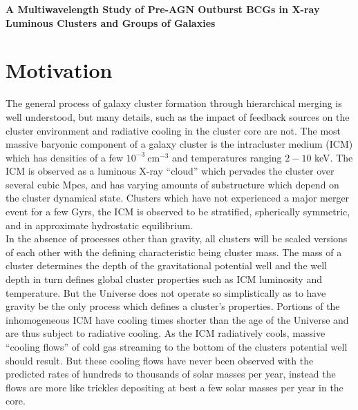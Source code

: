 \documentclass[11pt]{article}
\begin{document}
\begin{center}
\LARGE
\textbf{A Multiwavelength Study of Pre-AGN Outburst BCGs in X-ray
Luminous Clusters and Groups of Galaxies}
\end{center}
\normalsize

\section{Motivation}

The general process of galaxy cluster formation through hierarchical
merging is well understood, but many details, such as the impact of
feedback sources on the cluster environment and radiative cooling in
the cluster core are not. The most massive baryonic component of a
galaxy cluster is the intracluster medium (ICM) which has densities of
a few $10^{-3} \mathrm{~cm}^{-3}$ and temperatures ranging
$2-10$ keV. The ICM is observed as a luminous X-ray ``cloud'' which
pervades the cluster over several cubic Mpcs, and has varying
amounts of substructure which depend on the cluster dynamical
state. Clusters which have not experienced a major merger event for a
few Gyrs, the ICM is observed to be stratified, spherically symmetric,
and in approximate hydrostatic equilibrium.\\

In the absence of processes other than gravity, all clusters will
be scaled versions of each other with the defining characteristic
being cluster mass. The mass of a cluster determines the depth of the
gravitational potential well and the well depth in turn defines global
cluster properties such as ICM luminosity and temperature. But the
Universe does not operate so simplistically as to have gravity be the
only process which defines a cluster's properties. Portions of the
inhomogeneous ICM have cooling times shorter than the age of the
Universe and are thus subject to radiative cooling. As the ICM
radiatively cools, massive ``cooling flows'' of cold gas streaming to
the bottom of the clusters potential well should result. But these
cooling flows have never been observed with the predicted rates of
hundreds to thousands of solar masses per year, instead the flows are
more like trickles depositing at best a few solar masses per year in
the core.\\
\end{document}

